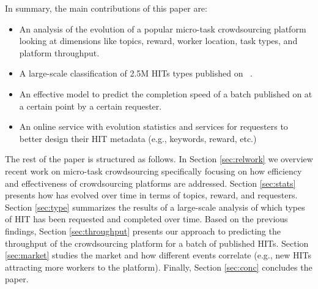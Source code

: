 In summary, the main contributions of this paper are:
\begin{itemize}

	\item An analysis of the evolution of a popular micro-task crowdsourcing platform looking at dimensions like topics, reward, worker location, task types, and platform throughput.

	\item A large-scale classification of 2.5M HITs types published on \amt\ .

	\item An effective model to predict the completion speed of a batch published on \amt at a certain point by a certain requester.

	\item An online service with evolution statistics and services for requesters to better design their HIT metadata (e.g., keywords, reward, etc.)

\end{itemize}


The rest of the paper is structured as follows.
In Section \ref{sec:relwork} we overview recent work on micro-task crowdsourcing specifically focusing on how  efficiency and effectiveness  of crowdsourcing platforms are addressed.
Section \ref{sec:stats} presents how \amt has evolved over time in terms of topics, reward, and requesters.
Section \ref{sec:type} summarizes the results of a large-scale analysis of which types of HIT has been requested and completed over time.
Based on the previous findings, Section \ref{sec:throughput} presents our approach to predicting the throughput of the crowdsourcing platform for a batch of published HITs.
Section \ref{sec:market} studies the \amt market and how different events correlate (e.g., new HITs attracting more workers to the platform).
Finally, Section \ref{sec:conc} concludes the paper.

